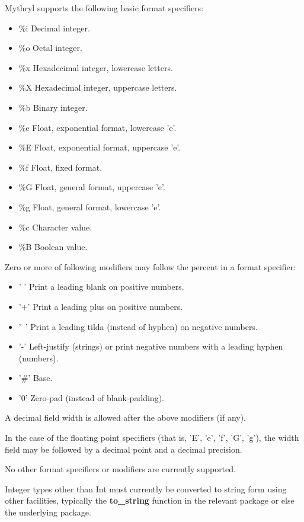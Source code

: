 Mythryl supports the following basic format specifiers: 
\begin{itemize}
\item \%i Decimal integer.
\item \%o Octal integer.
\item \%x Hexadecimal integer, lowercase letters.
\item \%X Hexadecimal integer, uppercase letters.
\item \%b Binary integer.
\item \%e Float, exponential format, lowercase 'e'.
\item \%E Float, exponential format, uppercase 'e'.
\item \%f Float, fixed format.
\item \%G Float, general format, uppercase 'e'.
\item \%g Float, general format, lowercase 'e'.
\item \%c Character value.
\item \%B Boolean value.
\end{itemize}

Zero or more of following modifiers may follow the percent in a format specifier: 
\begin{itemize}
\item ' ' Print a leading blank on positive numbers.
\item '+' Print a leading plus on positive numbers.
\item '~' Print a leading tilda (instead of hyphen) on negative numbers.
\item '-' Left-justify (strings) or print negative numbers with a leading hyphen (numbers).
\item '#' Base.
\item '0' Zero-pad (instead of blank-padding).
\end{itemize}

A decimal field width is allowed after the above modifiers (if any).

In the case of the floating point specifiers (that is, 'E', 'e', 'f', 'G', 'g'), the 
width field may be followed by a decimal point and a decimal precision.

No other format specifiers or modifiers are currently supported.

Integer types other than Int must currently be converted to string form using other facilities, 
typically the {\bf to\_string} function in the relevant package or else the underlying 
 package.

